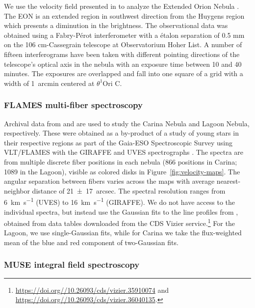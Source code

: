 \documentclass[fleqn,usenatbib, useAMS, a4paper]{mnras}
\begin{document}
We use the velocity field presented in \citet{1987A&A...176..347H} to analyze the Extended Orion Nebula \citetext{EON henceforth;  \citealp{2008Sci...319..309G}}.
The EON is an extended region in southwest direction from the Huygens region which presents a diminution in the brightness.
The observational data was obtained using a Fabry-Pérot interferometer with a étalon separation of 0.5 mm on the 106 cm-Cassegrain telescope at Observatorium Hoher List. 
A number of fifteen interferograms have been taken with different pointing directions of the telescope's optical axis in the nebula with an exposure time between 10 and 40 minutes. 
The exposures are overlapped and fall into one square of a grid with a width of \SI{1}{arcmin} centered at \(\theta^{1}\)Ori C.   


\subsubsection{FLAMES multi-fiber spectroscopy}
\label{sec:flames-multi-fiber}

Archival data from \citet{Damiani:2016a} and \citet{Damiani:2017b} are used
to study the Carina Nebula and Lagoon Nebula, respectively.
These were obtained as a by-product of a study of young stars in their respective regions
as part of the Gaia-ESO Spectroscopic Survey \citep{Gilmore:2012v, Randich:2013m}
using VLT/FLAMES with the GIRAFFE and UVES spectrographs \citep{2002Msngr.110....1P}.
The spectra are from multiple discrete fiber positions in each nebula
(866 positions in Carina; 1089 in the Lagoon),
visible as colored disks in Figure~\ref{fig:velocity-maps}.
The angular separation between fibers varies across the maps with
average nearest-neighbor distance of \SI{21 \pm 17}{arcsec}.
The spectral resolution ranges from  \SI{6}{km.s^{-1}} (UVES) to \SI{16}{km.s^{-1}} (GIRAFFE).
We do not have access to the individual spectra, but instead use the
Gaussian fits to the line profiles from \citep{Damiani:2016a, Damiani:2017b},
obtained from data tables downloaded from the CDS Vizier service.\footnote{%
  \url{https://doi.org//10.26093/cds/vizier.35910074} and
  \url{https://doi.org//10.26093/cds/vizier.36040135}.}
For the Lagoon, we use single-Gaussian fits, while for Carina we take the
flux-weighted mean of the blue and red component of two-Gaussian fits.


\subsubsection{MUSE integral field spectroscopy}
\label{sec:muse-integral-field}
\end{document}
